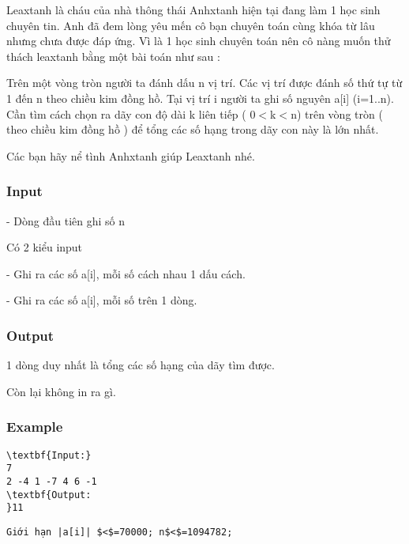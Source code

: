

Leaxtanh là cháu của nhà thông thái Anhxtanh hiện tại đang làm 1 học sinh chuyên tin. Anh đã đem lòng yêu mến cô bạn chuyên toán cùng khóa từ lâu nhưng chưa được đáp ứng. Vì là 1 học sinh chuyên toán nên cô nàng muốn thử thách leaxtanh bằng một bài toán như sau :

Trên một vòng tròn người ta đánh dấu n vị trí. Các vị trí được đánh số thứ tự từ 1 đến n theo chiều kim đồng hồ. Tại vị trí i người ta ghi số nguyên a[i] (i=1..n). Cần tìm cách chọn ra dãy con độ dài k liên tiếp ( 0$<$k$<$n) trên vòng tròn ( theo chiều kim đồng hồ ) để tổng các số hạng trong dãy con này là lớn nhất.

Các bạn hãy nể tình Anhxtanh giúp Leaxtanh nhé.

\subsubsection{Input}

- Dòng đầu tiên ghi số n

Có 2 kiểu input

- Ghi ra các số a[i], mỗi số cách nhau 1 dấu cách.

- Ghi ra các số a[i], mỗi số trên 1 dòng.

\subsubsection{Output}

1 dòng duy nhất là tổng các số hạng của dãy tìm được.

Còn lại không in ra gì.

\subsubsection{Example}
\begin{verbatim}
\textbf{Input:}
7
2 -4 1 -7 4 6 -1
\textbf{Output:
}11\end{verbatim}
\begin{verbatim}
Giới hạn |a[i]| $<$=70000; n$<$=1094782;\end{verbatim}